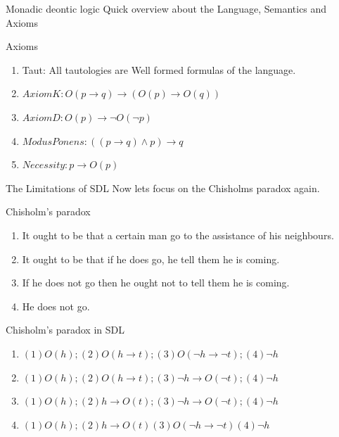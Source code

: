 \documentclass{beamer}
\begin{document}
\begin{frame}{Monadic deontic logic}
Quick overview about the Language, Semantics and Axioms
\begin{block}{Axioms}
\begin{enumerate}
\item Taut: All tautologies are Well formed formulas of the language.
\item  $Axiom K: O(p \to q) \to (O(p) \to O(q)) $
\item $ Axiom D: O(p) \to \neg O(\neg p)$
\item $Modus Ponens: ((p \to q) \land p) \to q $
\item $ Necessity: p \to O(p)$
\end{enumerate}
\end{block}
\end{frame}
\begin{frame}{The Limitations of SDL}
Now lets focus on the Chisholms paradox again.
\begin{block}{Chisholm's paradox}
\begin{enumerate}
\item  It ought to be that a certain man go to the assistance of his neighbours.
\item  It ought to be that if he does go, he tell them he is coming.
\item If he does not go then he ought not to tell them he is coming.
\item He does not go.
\end{enumerate}
\end{block}
\begin{block}{Chisholm's paradox in SDL}
\begin{enumerate}
\item $(1)O(h);(2)O(h\to t);(3)O(\neg h\to \neg t);(4) \neg h$
\item $(1)O(h);(2)O(h \to t);(3) \neg h \to O (\neg t); (4) \neg h$
\item $(1)O(h);(2)h\to O(t);(3)\neg h \to O(\neg t) ;(4)\neg h $
\item $ (1)O(h);(2)h\to O(t)(3)O(\neg h\to \neg t)(4)\neg h$
\end{enumerate}
\end{block}
\end{frame}
\end{document}
